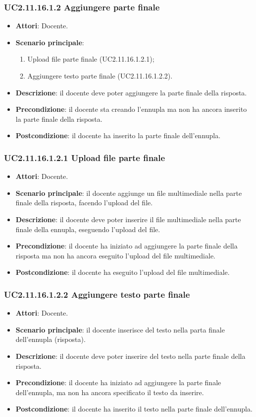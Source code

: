 \subsubsection{UC2.11.16.1.2 Aggiungere parte finale}
\begin{itemize}
\item \textbf{Attori}: Docente.
\item \textbf{Scenario principale}:
\begin{enumerate}
\item Upload file parte finale (UC2.11.16.1.2.1);
\item Aggiungere testo parte finale (UC2.11.16.1.2.2).
\end{enumerate}
\item \textbf{Descrizione}: il docente deve poter aggiungere la parte finale della risposta.
\item \textbf{Precondizione}: il docente sta creando l'ennupla ma non ha ancora inserito la parte finale della risposta.
\item \textbf{Postcondizione}: il docente ha inserito la parte finale dell'ennupla.
\end{itemize}
\subsubsection{UC2.11.16.1.2.1 Upload file parte finale}
\begin{itemize}
\item \textbf{Attori}: Docente.
\item \textbf{Scenario principale}: il docente aggiunge un file multimediale nella parte finale della risposta, facendo l'upload del file.
\item \textbf{Descrizione}: il docente deve poter inserire il file multimediale nella parte finale della ennupla, eseguendo l'upload del file.
\item \textbf{Precondizione}: il docente ha iniziato ad aggiungere la parte finale della risposta ma non ha ancora eseguito l'upload del file multimediale.
\item \textbf{Postcondizione}: il docente ha eseguito l'upload del file multimediale.
\end{itemize}
\subsubsection{UC2.11.16.1.2.2 Aggiungere testo parte finale}
\begin{itemize}
\item \textbf{Attori}: Docente.
\item \textbf{Scenario principale}: il docente inserisce del testo nella parta finale dell'ennupla (risposta).
\item \textbf{Descrizione}: il docente deve poter inserire del testo nella parte finale della risposta.
\item \textbf{Precondizione}: il docente ha iniziato ad aggiungere la parte finale dell'ennupla, ma non ha ancora specificato il testo da inserire.
\item \textbf{Postcondizione}: il docente ha inserito il testo nella parte finale dell'ennupla.
\end{itemize}
